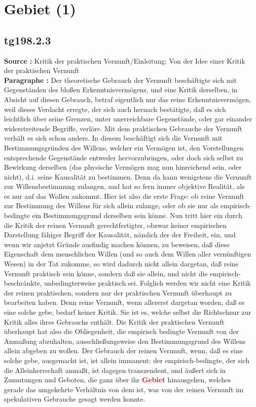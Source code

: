 \documentclass[a4paper,12pt,twoside]{book}
\newcommand{\match}[1]{\textcolor{red}{\textbf{#1}}}
\newcommand{\unnumberedsection}[1]{
	\section*{#1}
	\addcontentsline{toc}{section}{#1}
	\markright{#1}
}
\begin{document}
	\unnumberedsection{Gebiet (1)} 
	\subsection*{tg198.2.3} 
	\textbf{Source : }Kritik der praktischen Vernunft/Einleitung: Von der Idee einer Kritik der praktischen Vernunft\\  
	
	\noindent\textbf{Paragraphe : }Der theoretische Gebrauch der Vernunft beschäftigte sich mit Gegenständen des bloßen Erkenntnisvermögens, und eine Kritik derselben, in Absicht auf diesen Gebrauch, betraf eigentlich nur das reine Erkenntnisvermögen, weil dieses Verdacht erregte, der sich auch hernach bestätigte, daß es sich leichtlich über seine Grenzen, unter unerreichbare Gegenstände, oder gar einander widerstreitende Begriffe, verlöre. Mit dem praktischen Gebrauche der Vernunft verhält es sich schon anders. In diesem beschäftigt sich die Vernunft mit Bestimmungsgründen des Willens, welcher ein Vermögen ist, den Vorstellungen entsprechende Gegenstände entweder hervorzubringen, oder doch sich selbst zu Bewirkung derselben (das physische Vermögen mag nun hinreichend sein, oder nicht), d.i. seine Kausalität zu bestimmen. Denn da kann wenigstens die Vernunft zur Willensbestimmung zulangen, und hat so fern immer objektive Realität, als es nur auf das Wollen ankommt. Hier ist also die erste Frage: ob reine Vernunft zur Bestimmung des Willens für sich allein zulange, oder ob sie nur als empirisch- bedingte ein Bestimmungsgrund derselben sein könne. Nun tritt hier ein durch die Kritik der reinen Vernunft gerechtfertigter, obzwar keiner empirischen Darstellung fähiger Begriff der Kausalität, nämlich der der Freiheit, ein, und wenn wir anjetzt Gründe ausfindig machen können, zu beweisen, daß diese Eigenschaft dem menschlichen Willen (und so auch dem Willen aller vernünftigen Wesen) in der Tat zukomme, so wird dadurch nicht allein dargetan, daß reine Vernunft praktisch sein könne, sondern daß sie allein, und nicht die empirisch-beschränkte, unbedingterweise praktisch sei. Folglich werden wir nicht eine Kritik der reinen praktischen, sondern nur der praktischen Vernunft überhaupt zu bearbeiten haben. Denn reine Vernunft, wenn allererst dargetan worden, daß es eine solche gebe, bedarf keiner Kritik. Sie ist es, welche selbst die Richtschnur zur Kritik alles ihres Gebrauchs enthält. Die Kritik der praktischen Vernunft überhaupt  hat also die Obliegenheit, die empirisch bedingte Vernunft von der Anmaßung abzuhalten, ausschließungsweise den Bestimmungsgrund des Willens allein abgeben zu wollen. Der Gebrauch der reinen Vernunft, wenn, daß es eine solche gebe, ausgemacht ist, ist allein immanent; der empirisch-bedingte, der sich die Alleinherrschaft anmaßt, ist dagegen transzendent, und äußert sich in Zumutungen und Geboten, die ganz über ihr \match{Gebiet} hinausgehen, welches gerade das umgekehrte Verhältnis von dem ist, was von der reinen Vernunft im spekulativen Gebrauche gesagt werden konnte. 
	
\end{document}
